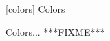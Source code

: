 
 [colors] {Colors}

\pnum
Colors... ***FIXME***

\addtocounter{SectionDepthBase}{1}


\addtocounter{SectionDepthBase}{-1}
